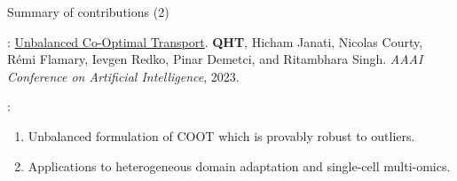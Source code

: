 \documentclass{beamer}
\begin{document}
\begin{frame}{Summary of contributions (2)}
  \scriptsize

  \vspace{-3cm}
  {}: \ul{Unbalanced Co-Optimal Transport}.
  \textbf{QHT}, Hicham Janati, Nicolas Courty, Rémi Flamary, Ievgen Redko,
  Pinar Demetci, and Ritambhara Singh.
  \textit{AAAI Conference on Artificial Intelligence}, 2023.

  \vspace{0.3cm}
  {}:
  \begin{enumerate}
    \item Unbalanced formulation of COOT which is provably robust to outliers.
    \item Applications to heterogeneous domain adaptation and single-cell multi-omics.
  \end{enumerate}

\end{frame}
\end{document}
